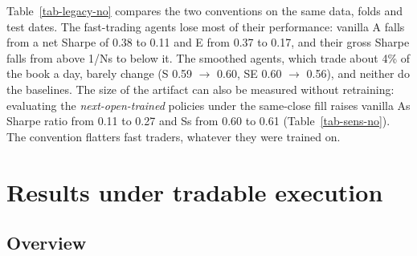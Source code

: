 \documentclass[11pt]{article}
\begin{document}
Table~\ref{tab-legacy-no} compares the two conventions on the same data, folds and test dates. The fast-trading agents lose most of their performance: vanilla A falls from a net Sharpe of 0.38 to 0.11 and E from 0.37 to 0.17, and their gross Sharpe falls from above 1/N\textquotesingle s to below it. The smoothed agents, which trade about 4\% of the book a day, barely change (S 0.59 $\to$ 0.60, SE 0.60 $\to$ 0.56), and neither do the baselines. The size of the artifact can also be measured without retraining: evaluating the \emph{next-open-trained} policies under the same-close fill raises vanilla A\textquotesingle s Sharpe ratio from 0.11 to 0.27 and S\textquotesingle s from 0.60 to 0.61 (Table~\ref{tab-sens-no}). The convention flatters fast traders, whatever they were trained on.

\section{Results under tradable execution}\label{s6}

\subsection{Overview}\label{overview}
\end{document}
